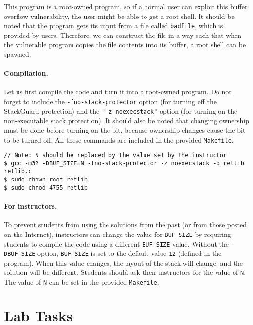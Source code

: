 This program is a root-owned \setuid program, so if a normal user can exploit this buffer
overflow vulnerability, the user might be able to get a root
shell.  It should be noted that the program gets its input from a file
called \texttt{badfile}, which is provided by users. Therefore, we can
construct the file in a way such that when
the vulnerable program copies the file contents into its buffer, a root
shell can be spawned.


\paragraph{Compilation.}
Let us first compile the code and turn it into a root-owned \setuid
program. Do not forget to include the 
\texttt{-fno-stack-protector} option (for turning off the StackGuard
protection) and the \texttt{"-z noexecstack"} option (for turning on
the non-executable stack protection). 
It should also be noted that changing ownership must be done before
turning on the \setuid bit, 
because ownership changes cause the \setuid bit to be turned off.
All these commands are included in the provided \texttt{Makefile}. 


\begin{lstlisting}
// Note: N should be replaced by the value set by the instructor
$ gcc -m32 -DBUF_SIZE=N -fno-stack-protector -z noexecstack -o retlib retlib.c
$ sudo chown root retlib           
$ sudo chmod 4755 retlib           
\end{lstlisting}


\paragraph{For instructors.}
To prevent students from using the solutions from the past (or from those
posted on the Internet), instructors can change the
value for \texttt{BUF\_SIZE} by requiring students to compile the
code using a different \texttt{BUF\_SIZE} value.
Without the \texttt{-DBUF\_SIZE}
option, \texttt{BUF\_SIZE} is set to the default value \texttt{12} (defined
in the program).
When this value changes, the layout of the stack
will change, and the solution will be different.
Students should ask their instructors for
the value of \texttt{N}. The value of \texttt{N} can be set 
in the provided \texttt{Makefile}. 



\section{Lab Tasks}



